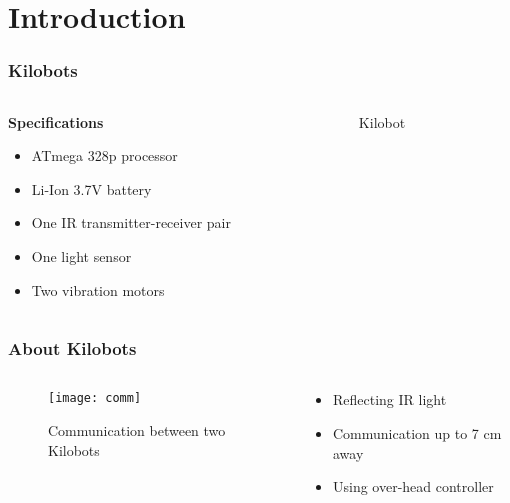 \section{Introduction}
\begin{frame}
	\frametitle{Kilobots}
	\begin{columns}
		\begin{column}{0.5\textwidth}
			\textbf{Specifications}
			\vspace{0.2cm}
			\begin{itemize}
				\item ATmega 328p processor 
				\item Li-Ion 3.7V battery 
				\item One IR transmitter-receiver pair 
				\item One light sensor 
				\item Two vibration motors
			\end{itemize}
		\end{column}
	\begin{column}{0.5\textwidth}
		\begin{figure}
			\centering
			\hspace{5cm}
			\caption{Kilobot}
		\end{figure}
	\end{column}
	\end{columns}
\end{frame}

\begin{frame}
	\frametitle{About Kilobots}
	\begin{columns}
		\begin{column}{0.4\textwidth}
			\begin{figure}
				\centering
				\texttt{[image: comm]}
				\caption{Communication between two Kilobots}
			\end{figure}
		\end{column}
		
		\begin{column}{0.45\textwidth}
			\begin{itemize}
				\item Reflecting IR light
				\item Communication up to 7 cm away 
				\item Using over-head controller
			\end{itemize}
		\end{column}
	\end{columns}
\end{frame}

